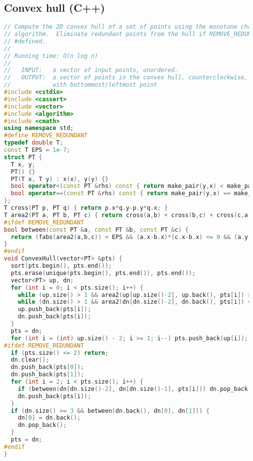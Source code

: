 \subsection{Convex hull (C++)}
\begin{lstlisting}[language=C++]
// Compute the 2D convex hull of a set of points using the monotone chain
// algorithm.  Eliminate redundant points from the hull if REMOVE_REDUNDANT is 
// #defined.
//
// Running time: O(n log n)
//
//   INPUT:   a vector of input points, unordered.
//   OUTPUT:  a vector of points in the convex hull, counterclockwise, starting
//            with bottommost/leftmost point
#include <cstdio>
#include <cassert>
#include <vector>
#include <algorithm>
#include <cmath>
using namespace std;
#define REMOVE_REDUNDANT
typedef double T;
const T EPS = 1e-7;
struct PT { 
  T x, y; 
  PT() {} 
  PT(T x, T y) : x(x), y(y) {}
  bool operator<(const PT &rhs) const { return make_pair(y,x) < make_pair(rhs.y,rhs.x); }
  bool operator==(const PT &rhs) const { return make_pair(y,x) == make_pair(rhs.y,rhs.x); }
};
T cross(PT p, PT q) { return p.x*q.y-p.y*q.x; }
T area2(PT a, PT b, PT c) { return cross(a,b) + cross(b,c) + cross(c,a); }
#ifdef REMOVE_REDUNDANT
bool between(const PT &a, const PT &b, const PT &c) {
  return (fabs(area2(a,b,c)) < EPS && (a.x-b.x)*(c.x-b.x) <= 0 && (a.y-b.y)*(c.y-b.y) <= 0);
}
#endif
void ConvexHull(vector<PT> &pts) {
  sort(pts.begin(), pts.end());
  pts.erase(unique(pts.begin(), pts.end()), pts.end());
  vector<PT> up, dn;
  for (int i = 0; i < pts.size(); i++) {
    while (up.size() > 1 && area2(up[up.size()-2], up.back(), pts[i]) >= 0) up.pop_back();
    while (dn.size() > 1 && area2(dn[dn.size()-2], dn.back(), pts[i]) <= 0) dn.pop_back();
    up.push_back(pts[i]);
    dn.push_back(pts[i]);
  }
  pts = dn;
  for (int i = (int) up.size() - 2; i >= 1; i--) pts.push_back(up[i]);
#ifdef REMOVE_REDUNDANT
  if (pts.size() <= 2) return;
  dn.clear();
  dn.push_back(pts[0]);
  dn.push_back(pts[1]);
  for (int i = 2; i < pts.size(); i++) {
    if (between(dn[dn.size()-2], dn[dn.size()-1], pts[i])) dn.pop_back();
    dn.push_back(pts[i]);
  }
  if (dn.size() >= 3 && between(dn.back(), dn[0], dn[1])) {
    dn[0] = dn.back();
    dn.pop_back();
  }
  pts = dn;
#endif
}
\end{lstlisting}
